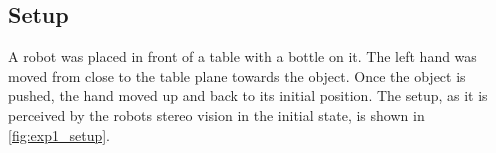\subsection{Setup}

A robot was placed in front of a table with a bottle on it. The left hand was moved from close to the table plane towards the object. Once the object is pushed, the hand moved up and back to its initial position.
The setup, as it is perceived by the robots stereo vision in the initial state, is shown in \cref{fig:exp1_setup}.

%


